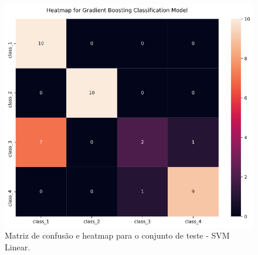 \documentclass[
	article,			%
	11pt,				%
	oneside,			%
	a4paper,			%
	english,			%
	brazil,				%
	sumario=tradicional
	]{abntex2}
\begin{document}
\begin{figure}[h!]
 \centering
 \includegraphics[scale=0.5]{fig/svm_cm.png}
 \caption{Matriz de confusão e heatmap para o conjunto de teste - SVM Linear.}
 \label{fig:svm_cm}
\end{figure}
\end{document}
